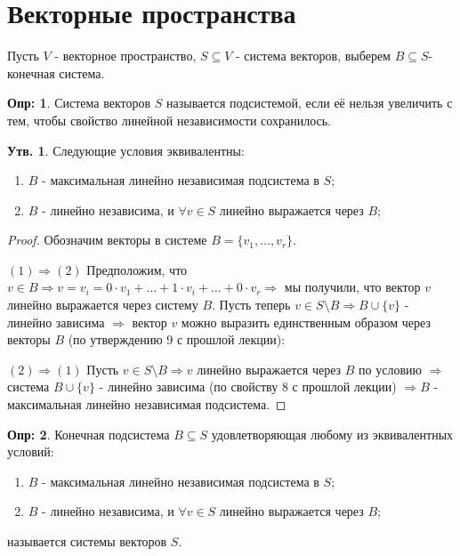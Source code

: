 \documentclass[12pt]{article}
\newcommand{\RN}[1]{%
	\textup{\uppercase\expandafter{\romannumeral#1}}%
}
\theoremstyle{definition}
\newtheorem{defn}{Опр:}
\newtheorem{prop}{Утв.}
\begin{document}
\lhead{Алгебра-\RN{1}}
\section*{Векторные пространства}
Пусть $V$ - векторное пространство, $S \subseteq V$ - система векторов, выберем $B \subseteq S$- конечная система.

\begin{defn}
	Система векторов $S$ называется  подсистемой, если её нельзя увеличить с тем, чтобы свойство линейной независимости сохранилось.
\end{defn}

\begin{prop}
	Следующие условия эквивалентны:
	\begin{enumerate}[label=(\arabic*)]
		\item $B$ - максимальная линейно независимая подсистема в $S$;
		\item $B$ - линейно независима, и $\forall v \in S$ линейно выражается через $B$;
	\end{enumerate}
\end{prop}
\begin{proof}
	Обозначим векторы в системе $B = \{v_1,\dotsc, v_r\}$.
	
	$(1) \Rightarrow (2)$ Предположим, что $v \in B \Rightarrow  v = v_i = 0{\cdot}v_1 + \dotsc + 1{\cdot}v_i + \dotsc + 0{\cdot}v_r \Rightarrow$ мы получили, что вектор $v$ линейно выражается через систему $B$. Пусть теперь $v \in S\setminus B \Rightarrow B \cup \{v\}$ - линейно зависима $\Rightarrow$ вектор $v$ можно выразить единственным образом через векторы $B$ (по утверждению $9$ с прошлой лекции):
	
	$(2) \Rightarrow (1)$ Пусть $v \in S \setminus B \Rightarrow v$ линейно выражается через $B$ по условию $\Rightarrow$ система $B \cup \{v\}$ - линейно зависима (по свойству $8$ с прошлой лекции) $\Rightarrow B$ - максимальная линейно независимая подсистема.
\end{proof}

\begin{defn}
	Конечная подсистема $B \subseteq S$ удовлетворяющая любому из эквивалентных условий:
	\begin{enumerate}[label=(\arabic*)]
		\item $B$ - максимальная линейно независимая подсистема в $S$;
		\item $B$ - линейно независима, и $\forall v \in S$ линейно выражается через $B$;
	\end{enumerate}
	называется  системы векторов $S$.
\end{defn}
\end{document}
